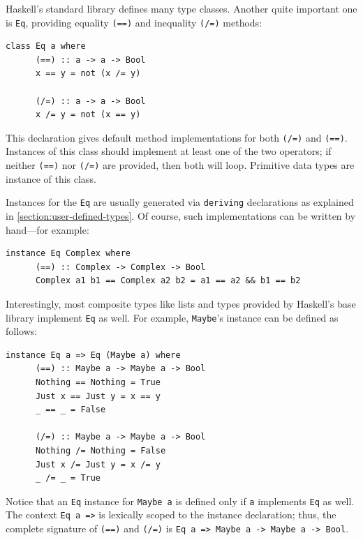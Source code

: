 \documentclass[UdineBachThesis,american,11pt]{PhdThesis}
\begin{document}
  Haskell's standard library defines many type classes. Another quite important
  one is \mbox{\texttt{Eq}}, providing equality \mbox{\texttt{(==)}} and
  inequality \mbox{\texttt{(/=)}} methods:

  \begin{Verbatim}[gobble=4,fontsize=\small]
    class Eq a where
      (==) :: a -> a -> Bool
      x == y = not (x /= y)

      (/=) :: a -> a -> Bool
      x /= y = not (x == y)
  \end{Verbatim}

  This declaration gives default method implementations for both
  \mbox{\texttt{(/=)}} and \mbox{\texttt{(==)}}. Instances of this class should
  implement at least one of the two operators; if neither \mbox{\texttt{(==)}}
  nor \mbox{\texttt{(/=)}} are provided, then both will loop. Primitive data
  types are instance of this class.

  Instances for the \mbox{\texttt{Eq}} are usually generated via
  \mbox{\texttt{deriving}} declarations as explained in
  \autoref{section:user-defined-types}. Of course, such implementations can be
  written by hand---for example:

  \begin{Verbatim}[gobble=4,fontsize=\small]
    instance Eq Complex where
      (==) :: Complex -> Complex -> Bool
      Complex a1 b1 == Complex a2 b2 = a1 == a2 && b1 == b2
  \end{Verbatim}

  Interestingly, most composite types like lists and types provided by Haskell's
  base library implement \mbox{\texttt{Eq}} as well. For example,
  \mbox{\texttt{Maybe}}'s instance can be defined as follows:

  \begin{Verbatim}[gobble=4,fontsize=\small]
    instance Eq a => Eq (Maybe a) where
      (==) :: Maybe a -> Maybe a -> Bool
      Nothing == Nothing = True
      Just x == Just y = x == y
      _ == _ = False

      (/=) :: Maybe a -> Maybe a -> Bool
      Nothing /= Nothing = False
      Just x /= Just y = x /= y
      _ /= _ = True
  \end{Verbatim}

  Notice that an \mbox{\texttt{Eq}} instance for \mbox{\texttt{Maybe a}} is
  defined only if \texttt{a} implements \mbox{\texttt{Eq}} as well. The context
  \mbox{\texttt{Eq a =>}} is lexically scoped to the instance declaration; thus,
  the complete signature of \mbox{\texttt{(==)}} and \mbox{\texttt{(/=)}} is
  \mbox{\texttt{Eq a => Maybe a -> Maybe a -> Bool}}.
\end{document}
